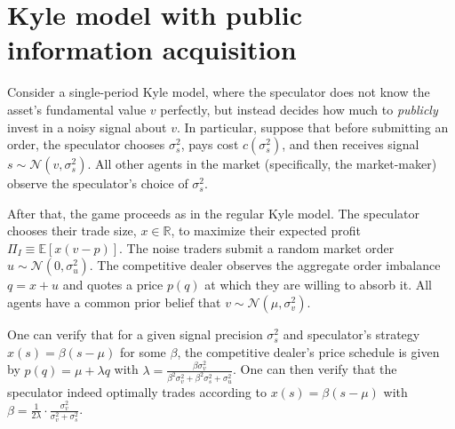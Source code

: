 \documentclass[a4paper]{article}
\begin{document}
\section{Kyle model with public information acquisition}

Consider a single-period Kyle model, where the speculator does not know the asset's fundamental value $v$ perfectly, but instead decides how much to \emph{publicly} invest in a noisy signal about $v$. In particular, suppose that before submitting an order, the speculator chooses $\sigma^2_s$, pays cost $c(\sigma^2_s)$, and then receives signal $s \sim \mathcal{N}(v, \sigma^2_s)$. All other agents in the market (specifically, the market-maker) observe the speculator's choice of $\sigma^2_s$.

After that, the game proceeds as in the regular Kyle model. The speculator chooses their trade size, $x \in \mathbb{R}$, to maximize their expected profit $\Pi_I \equiv \mathbb{E} [x(v-p)]$. The noise traders submit a random market order $u \sim \mathcal{N}(0,\sigma^2_u)$. The competitive dealer observes the aggregate order imbalance $q=x+u$ and quotes a price $p(q)$ at which they are willing to absorb it. All agents have a common prior belief that $v \sim \mathcal{N}(\mu, \sigma^2_v)$.

One can verify that for a given signal precision $\sigma^2_s$ and speculator's strategy $x(s) = \beta (s-\mu)$ for some $\beta$, the competitive dealer's price schedule is given by $p(q) = \mu + \lambda q$ with $\lambda = \frac{\beta \sigma^2_v}{\beta^2 \sigma^2_v + \beta^2\sigma^2_s + \sigma^2_u}$. One can then verify that the speculator indeed optimally trades according to $x(s) = \beta (s-\mu)$ with $\beta = \frac{1}{2\lambda} \cdot \frac{\sigma^2_v}{\sigma^2_v + \sigma^2_s}$.
\end{document}
